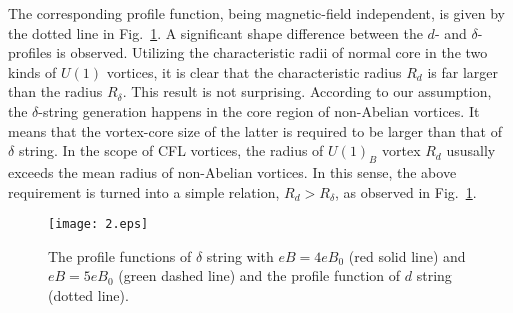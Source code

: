 \documentclass[prd, showpacs,nofootinbib,amsmath,amssymb]{revtex4}
\begin{document}
The corresponding profile function, being magnetic-field independent, is given by the dotted line in Fig.~\ref{fig:2}. A significant shape difference between the $d$- and $\delta$-profiles is observed.
Utilizing the characteristic radii of normal core in the two kinds of $U(1)$ vortices, it is clear that
the characteristic radius $R_d$ is far larger than the radius $R_\delta$.
This result is not surprising. According to our assumption, the $\delta$-string generation happens in
the core region of non-Abelian vortices. It means that the vortex-core size of the latter is required
to be larger than that of $\delta$ string. In the scope of CFL vortices, the radius of $U(1)_B$ vortex $R_d$ ususally exceeds the mean radius of non-Abelian vortices. In this sense, the
above requirement is turned into a simple relation, $R_d > R_\delta$, as observed in Fig.~\ref{fig:2}.

\begin{figure}
	\texttt{[image: 2.eps]}
	\caption{The profile functions of $\delta$ string with $eB = 4eB_0$ (red solid line) and
    $eB = 5 eB_0$ (green dashed line) and the profile function of $d$ string (dotted line).}
	\label{fig:2}
\end{figure}
\end{document}
